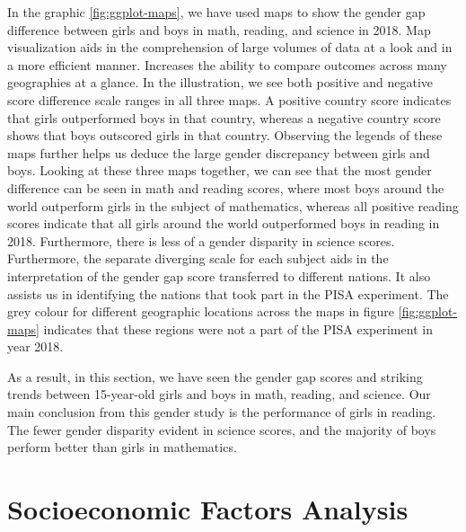 In the graphic \ref{fig:ggplot-maps}, we have used maps to show the
gender gap difference between girls and boys in math, reading, and
science in 2018. Map visualization aids in the comprehension of large
volumes of data at a look and in a more efficient manner. Increases the
ability to compare outcomes across many geographies at a glance. In the
illustration, we see both positive and negative score difference scale
ranges in all three maps. A positive country score indicates that girls
outperformed boys in that country, whereas a negative country score
shows that boys outscored girls in that country. Observing the legends
of these maps further helps us deduce the large gender discrepancy
between girls and boys. Looking at these three maps together, we can see
that the most gender difference can be seen in math and reading scores,
where most boys around the world outperform girls in the subject of
mathematics, whereas all positive reading scores indicate that all girls
around the world outperformed boys in reading in 2018. Furthermore,
there is less of a gender disparity in science scores. Furthermore, the
separate diverging scale for each subject aids in the interpretation of
the gender gap score transferred to different nations. It also assists
us in identifying the nations that took part in the PISA experiment. The
grey colour for different geographic locations across the maps in figure
\ref{fig:ggplot-maps} indicates that these regions were not a part of
the PISA experiment in year 2018.

As a result, in this section, we have seen the gender gap scores and
striking trends between 15-year-old girls and boys in math, reading, and
science. Our main conclusion from this gender study is the performance
of girls in reading. The fewer gender disparity evident in science
scores, and the majority of boys perform better than girls in
mathematics.

\hypertarget{socioeconomic-factors-analysis}{%
\section{Socioeconomic Factors
Analysis}\label{socioeconomic-factors-analysis}}

